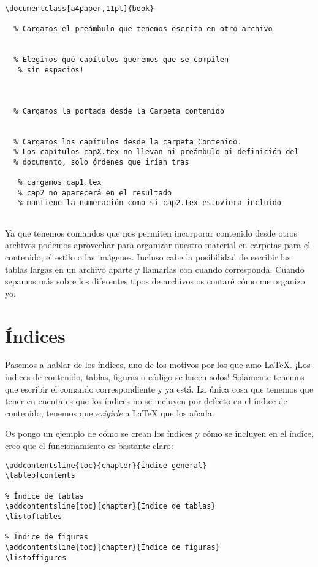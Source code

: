 \begin{lstlisting}[language={[latex]tex}]
\documentclass[a4paper,11pt]{book}

  % Cargamos el preámbulo que tenemos escrito en otro archivo
  
  
  % Elegimos qué capítulos queremos que se compilen
   % sin espacios!



  % Cargamos la portada desde la Carpeta contenido
  

  % Cargamos los capítulos desde la carpeta Contenido.
  % Los capítulos capX.tex no llevan ni preámbulo ni definición del
  % documento, solo órdenes que irían tras 
  
   % cargamos cap1.tex
   % cap2 no aparecerá en el resultado
   % mantiene la numeración como si cap2.tex estuviera incluido


\end{lstlisting}

Ya que tenemos comandos que nos permiten incorporar contenido desde
otros archivos podemos aprovechar para organizar nuestro material en
carpetas para el contenido, el estilo o las imágenes. Incluso cabe la
posibilidad de escribir las tablas largas en un archivo aparte y
llamarlas con \lstinline!! cuando corresponda. Cuando sepamos
más sobre los diferentes tipos de archivos os contaré cómo me organizo
yo.

\section{Índices}

Pasemos a hablar de los índices, uno de los motivos por los que amo
LaTeX. ¡Los índices de contenido, tablas, figuras o código se hacen
solos! Solamente tenemos que escribir el comando correspondiente y ya
está. La única cosa que tenemos que tener en cuenta es que los índices
no se incluyen por defecto en el índice de contenido, tenemos que
\emph{exigirle} a LaTeX que los añada.

Os pongo un ejemplo de cómo se crean los índices y cómo se incluyen en
el índice, creo que el funcionamiento es bastante claro:

\begin{lstlisting}[language={[latex]tex}]
% Índice de contenido
\addcontentsline{toc}{chapter}{Índice general}
\tableofcontents

% Índice de tablas
\addcontentsline{toc}{chapter}{Índice de tablas}
\listoftables

% Índice de figuras
\addcontentsline{toc}{chapter}{Índice de figuras}
\listoffigures
\end{lstlisting}

